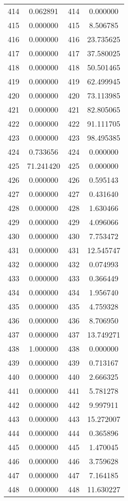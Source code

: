 \documentclass[12pt]{article}
\begin{document}
\begin{longtable}{@{}cccc@{}}
414 & 0.062891 & 414 & 0.000000 \\
415 & 0.000000 & 415 & 8.506785 \\
416 & 0.000000 & 416 & 23.735625 \\
417 & 0.000000 & 417 & 37.580025 \\
418 & 0.000000 & 418 & 50.501465 \\
419 & 0.000000 & 419 & 62.499945 \\
420 & 0.000000 & 420 & 73.113985 \\
421 & 0.000000 & 421 & 82.805065 \\
422 & 0.000000 & 422 & 91.111705 \\
423 & 0.000000 & 423 & 98.495385 \\
424 & 0.733656 & 424 & 0.000000 \\
425 & 71.241420 & 425 & 0.000000 \\
426 & 0.000000 & 426 & 0.595143 \\
427 & 0.000000 & 427 & 0.431640 \\
428 & 0.000000 & 428 & 1.630466 \\
429 & 0.000000 & 429 & 4.096066 \\
430 & 0.000000 & 430 & 7.753472 \\
431 & 0.000000 & 431 & 12.545747 \\
432 & 0.000000 & 432 & 0.074993 \\
433 & 0.000000 & 433 & 0.366449 \\
434 & 0.000000 & 434 & 1.956740 \\
435 & 0.000000 & 435 & 4.759328 \\
436 & 0.000000 & 436 & 8.706950 \\
437 & 0.000000 & 437 & 13.749271 \\
438 & 1.000000 & 438 & 0.000000 \\
439 & 0.000000 & 439 & 0.713167 \\
440 & 0.000000 & 440 & 2.666325 \\
441 & 0.000000 & 441 & 5.781278 \\
442 & 0.000000 & 442 & 9.997911 \\
443 & 0.000000 & 443 & 15.272007 \\
444 & 0.000000 & 444 & 0.365896 \\
445 & 0.000000 & 445 & 1.470045 \\
446 & 0.000000 & 446 & 3.759628 \\
447 & 0.000000 & 447 & 7.164185 \\
448 & 0.000000 & 448 & 11.630227 \\

\end{longtable}
\end{document}
